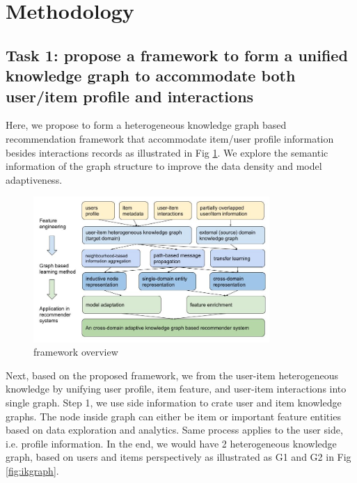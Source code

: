 


\section{Methodology}

\subsection*{Task 1: propose a framework to form a unified knowledge graph to accommodate both user/item profile and interactions}

Here, we propose to form a heterogeneous knowledge graph based recommendation framework that accommodate item/user profile information besides interactions records as illustrated in Fig \ref{fig:framework}. We explore the semantic information of the graph structure to improve the data density and model adaptiveness.

\begin{figure}[!h]
    \centering
    \includegraphics[width=0.8\textwidth]{figs/framework_overview.jpg}
    \caption{framework overview}\label{fig:framework}
\end{figure}

Next, based on the proposed framework, we from the user-item heterogeneous knowledge by unifying user profile, item feature, and user-item interactions into single graph.
Step 1, we use side information to crate user and item knowledge graphs. The node inside graph can either be item or important feature entities based on data exploration and analytics. Same process applies to the user side, i.e. profile information. In the end, we would have 2 heterogeneous knowledge graph, based on users and items perspectively as illustrated as G1 and G2 in Fig \ref{fig:ikgraph}.

